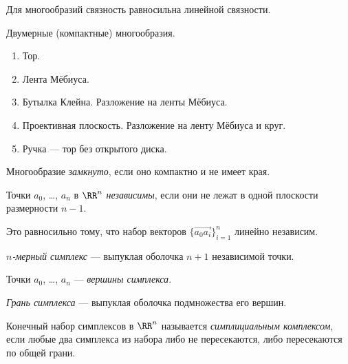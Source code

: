 \documentclass[12pt,a4paper]{article}
\begin{document}
    \begin{remark}
        Для многообразий связность равносильна линейной связности.
    \end{remark}

    \begin{example}
        Двумерные (компактные) многообразия.
        \begin{enumerate}
            \item Тор.
            \item Лента Мёбиуса.
            \item Бутылка Клейна. Разложение на ленты Мёбиуса.
            \item Проективная плоскость. Разложение на ленту Мёбиуса и круг.
            \item Ручка --- тор без открытого диска.
        \end{enumerate}
    \end{example}

    \begin{definition}
        Многообразие \emph{замкнуто}, если оно компактно и не имеет края.
    \end{definition}

    \begin{definition}
        Точки $a_0$, \dots, $a_n$ в $\RR^n$ \emph{независимы}, если они не лежат в одной плоскости размерности $n-1$.
    \end{definition}

    \begin{remark}
        Это равносильно тому, что набор векторов $\{\overrightarrow{a_0a_i}\}_{i=1}^n$ линейно независим.
    \end{remark}

    \begin{definition}
        \emph{$n$-мерный симплекс} --- выпуклая оболочка $n+1$ независимой точки.

        Точки $a_0$, \dots, $a_n$ --- \emph{вершины симплекса}.

        \emph{Грань симплекса} --- выпуклая оболочка подмножества его вершин.
    \end{definition}

    \begin{definition}
        Конечный набор симплексов в $\RR^n$ называется \emph{симплициальным комплексом}, если любые два симплекса из набора либо не пересекаются, либо пересекаются по общей грани.
    \end{definition}
\end{document}
